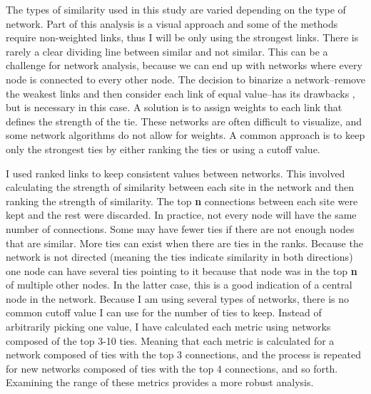 \documentclass[]{interact}
\theoremstyle{plain}%
\theoremstyle{definition}
\theoremstyle{remark}
\begin{document}
The types of similarity used in this study are varied depending on the
type of network. Part of this analysis is a visual approach and some of
the methods require non-weighted links, thus I will be only using the
strongest links. There is rarely a clear dividing line between similar
and not similar. This can be a challenge for network analysis, because
we can end up with networks where every node is connected to every other
node. The decision to binarize a network--remove the weakest links and
then consider each link of equal value--has its drawbacks
\citep{Peeples2013-tj}, but is necessary in this case. A solution is to
assign weights to each link that defines the strength of the tie. These
networks are often difficult to visualize, and some network algorithms
do not allow for weights. A common approach is to keep only the
strongest ties by either ranking the ties or using a cutoff value.

I used ranked links to keep consistent values between networks. This
involved calculating the strength of similarity between each site in the
network and then ranking the strength of similarity. The top \textbf{n}
connections between each site were kept and the rest were discarded. In
practice, not every node will have the same number of connections. Some
may have fewer ties if there are not enough nodes that are similar. More
ties can exist when there are ties in the ranks. Because the network is
not directed (meaning the ties indicate similarity in both directions)
one node can have several ties pointing to it because that node was in
the top \textbf{n} of multiple other nodes. In the latter case, this is
a good indication of a central node in the network. Because I am using
several types of networks, there is no common cutoff value I can use for
the number of ties to keep. Instead of arbitrarily picking one value, I
have calculated each metric using networks composed of the top 3-10
ties. Meaning that each metric is calculated for a network composed of
ties with the top 3 connections, and the process is repeated for new
networks composed of ties with the top 4 connections, and so forth.
Examining the range of these metrics provides a more robust analysis.
\end{document}
